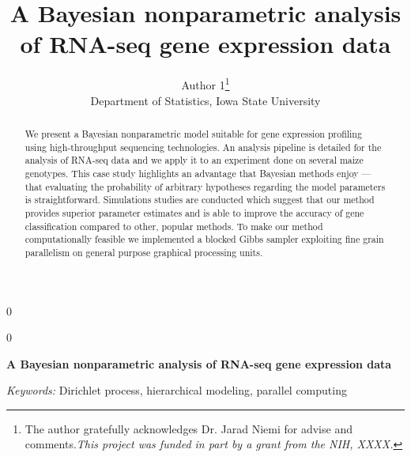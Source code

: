 \documentclass[12pt]{article}
\newcommand{\blind}{0}
\begin{document}
\newtoggle{thesis}
\togglefalse{thesis}
% 

\def\spacingset#1{\renewcommand{\baselinestretch}%
{#1}\small\normalsize} \spacingset{1}



\blind
{
  \title{\bf A Bayesian nonparametric analysis of RNA-seq gene expression data}
  \author{Author 1\thanks{
    The author gratefully acknowledges Dr. Jarad Niemi for advise and comments.\textit{This project was funded in part by a grant from the NIH, XXXX.}}\hspace{.2cm}\\
    Department of Statistics, Iowa State University}
  \maketitle
} \fi

\blind
{
  \bigskip
  \bigskip
  \bigskip
  \begin{center}
    {\LARGE\bf A Bayesian nonparametric analysis of RNA-seq gene expression data}
\end{center}
  \medskip
} \fi

\bigskip
\begin{abstract}
We present a Bayesian nonparametric model suitable for gene expression profiling using high-throughput sequencing technologies. An analysis pipeline is detailed for the analysis of RNA-seq data and we apply it to an experiment done on several maize genotypes. This case study highlights an advantage that Bayesian methods enjoy --- that evaluating the probability of arbitrary hypotheses regarding the model parameters is straightforward. Simulations studies are conducted which suggest that our method provides superior parameter estimates and is able to improve the accuracy of gene classification compared to other, popular methods. To make our method computationally feasible we implemented a blocked Gibbs sampler exploiting fine grain parallelism on general purpose graphical processing units.

\end{abstract}

\noindent%
{\it Keywords:}  Dirichlet process, hierarchical modeling, parallel computing
\vfill

\newpage
\tableofcontents

\spacingset{1.45} %


\end{document}
